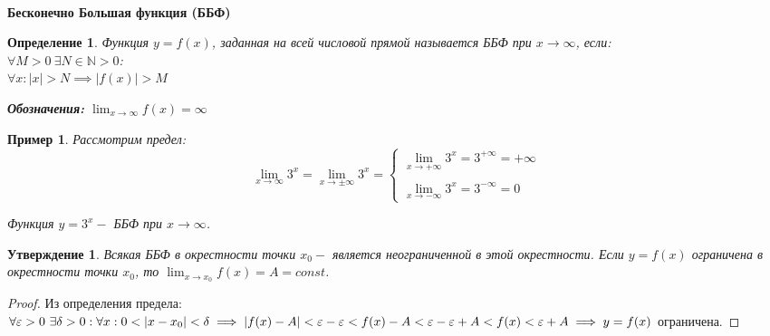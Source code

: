\documentclass[12pt, a4paper]{article}
\newtheorem{definition}{Определение}[subsection]
\newtheorem{example}{Пример}[subsection]
\newtheorem{statement}{Утверждение}[subsection]
\theoremstyle{remark}
\newcommand{\N}{\mathbb{N}}
\newcommand{\Y}{\mathbb{\forall}}
\newcommand{\F}{\mathbb{\exists}}
\newcommand{\E}{\mathbb{\varepsilon}}
\begin{document}
	\paragraph{} \centerline{\textbf{Бесконечно Большая функция (ББФ)}}
	
	\begin{definition}
		Функция $y = f(x)$, заданная на всей числовой прямой называется ББФ при $x \to \infty$, если: \\
		$\Y M > 0 \ \F N \in \N > 0$: \\
		$\Y x: |x| > N \implies |f(x)| > M$ 
		\vspace{0.4cm}
		
		\noindent\textbf{Обозначения:} $\lim_{x \to \infty} f(x) = \infty$
	\end{definition}
	
	\begin{example}
		Рассмотрим предел:
		\[
		\lim_{x \to \infty} 3^x = \lim_{x \to \pm\infty} 3^x = 
		\left\{
		\begin{array}{l}
			\displaystyle \lim_{x \to +\infty} 3^x = 3^{+\infty} = +\infty \\
			\\
			\displaystyle \lim_{x \to -\infty} 3^x = 3^{-\infty} = 0
		\end{array}
		\right.
		\]
		
		\hspace{4.5cm}Функция $y = 3^x -$ ББФ при $x \to \infty$.
	\end{example}
	
	\newpage
	
	\begin{statement}
		Всякая ББФ в окрестности точки $x_0 -$ является неограниченной в этой окрестности. Если $y = f(x)$ ограничена в окрестности точки $x_0$, то $\lim_{x \to x_0} f(x) = A = const$. 
	\end{statement}
	
	\begin{proof}
		Из определения предела: \\
		$\Y\E > 0 \ \F \delta > 0: \Y x: 0 < |x - x_0| < \delta \implies |f(x) - A| < \E \\
		-\E < f(x) - A < \E \\
		-\E + A < f(x) < \E + A \implies y = f(x)$ ограничена.	
	\end{proof}
\end{document}
